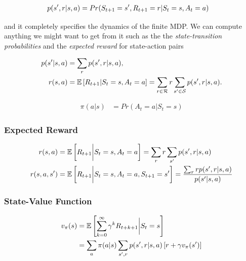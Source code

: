 \documentclass[result.tex]{subfiles}
\begin{document}
    \begin{align*}
        p(s^\prime, r | s, a) &=
        Pr(S_{t + 1} = s^\prime, R_{t + 1} = r | S_t = s, A_t = a)
    \end{align*}

    and it completely specifies the dynamics of the finite MDP. We can compute anything we might want to get from it such as the the \textit{state-transition probabilities} and the \textit{expected reward} for state-action pairs

    \begin{align*}
        p(s^\prime | s, a) &=
        \sum_r p(s^\prime, r | s, a), \\
        r(s, a) &=
        \mathbb{E} \left[ R_{t + 1} | S_t = s, A_t = a \right] =
        \sum_{r \in \mathcal{R}} r \sum_{s^\prime \in \mathcal{S}} p(s^\prime, r | s, a).
    \end{align*}

    \begin{align*}
        \pi(a | s) &= Pr(A_t = a | S_t = s)
    \end{align*}

    \subsubsection*{Expected Reward}

    \begin{align*}
        r(s, a) &=
        \mathbb{E} \left[ R_{t + 1} \bigg\rvert S_t = s, A_t = a \right] =
        \sum_r r \sum_{s^\prime} p(s^\prime, r | s, a) \\
        r(s, a, s^\prime) &=
        \mathbb{E} \left[ R_{t + 1} \bigg\rvert S_t = s, A_t = a, S_{t + 1} = s^\prime \right] =
        \frac{\sum_r r p(s^\prime, r | s, a)}{p(s^\prime | s, a)}
    \end{align*}


    \subsubsection*{State-Value Function}

    \begin{align*}
        v_{\pi}(s) &= \mathbb{E} \left[ \sum_{k=0}^{\infty} \gamma^k R_{t + k + 1} \bigg\rvert S_t = s \right] \\
        &= \sum_a \pi(a | s) \sum_{s^\prime, r} p(s^\prime, r | s, a) \left[ r + \gamma v_\pi(s^\prime) \right]
    \end{align*}
\end{document}
